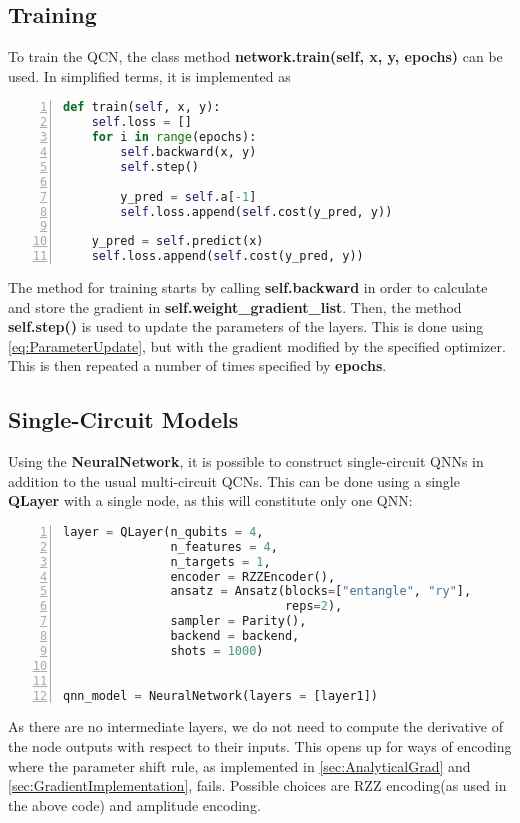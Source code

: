 \subsection{Training}\label{sec:QCNTraining}
To train the QCN, the class method \textbf{network.train(self, x, y, epochs)} can be used. In simplified terms, it is implemented as

\begin{lstlisting}[language=python, numbers=left]
def train(self, x, y):
    self.loss = []
    for i in range(epochs):
        self.backward(x, y)
        self.step()

        y_pred = self.a[-1]
        self.loss.append(self.cost(y_pred, y))
            
    y_pred = self.predict(x)
    self.loss.append(self.cost(y_pred, y))
\end{lstlisting}
The method for training starts by calling \textbf{self.backward} in order to calculate and store the gradient in \textbf{self.weight\_gradient\_list}. Then, the method \textbf{self.step()} is used to update the parameters of the layers. This is done using \autoref{eq:ParameterUpdate}, but with the gradient modified by the specified optimizer. This is then repeated a number of times specified by \textbf{epochs}.

\subsection{Single-Circuit Models}\label{sec:Single-CircuitModel}
Using the \textbf{NeuralNetwork}, it is possible to construct single-circuit QNNs in addition to the usual multi-circuit QCNs. This can be done using a single \textbf{QLayer} with a single node, as this will constitute only one QNN:
\begin{lstlisting}[language=python, numbers=left]
layer = QLayer(n_qubits = 4,
               n_features = 4,
               n_targets = 1,
               encoder = RZZEncoder(),
               ansatz = Ansatz(blocks=["entangle", "ry"],
                               reps=2),
               sampler = Parity(),
               backend = backend,
               shots = 1000)
                               

qnn_model = NeuralNetwork(layers = [layer1])
\end{lstlisting}
As there are no intermediate layers, we do not need to compute the derivative of the node outputs with respect to their inputs. This opens up for ways of encoding where the parameter shift rule, as implemented in \autoref{sec:AnalyticalGrad} and \autoref{sec:GradientImplementation}, fails. Possible choices are RZZ encoding(as used in the above code) and amplitude encoding.

